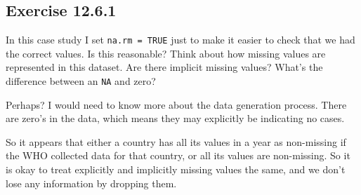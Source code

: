 \documentclass[]{book}
\newenvironment{Shaded}{\begin{snugshade}}{\end{snugshade}}
\newcommand{\CommentTok}[1]{\textcolor[rgb]{0.56,0.35,0.01}{\textit{#1}}}
\newcommand{\DataTypeTok}[1]{\textcolor[rgb]{0.13,0.29,0.53}{#1}}
\newcommand{\DecValTok}[1]{\textcolor[rgb]{0.00,0.00,0.81}{#1}}
\newcommand{\KeywordTok}[1]{\textcolor[rgb]{0.13,0.29,0.53}{\textbf{#1}}}
\newcommand{\NormalTok}[1]{#1}
\newcommand{\OperatorTok}[1]{\textcolor[rgb]{0.81,0.36,0.00}{\textbf{#1}}}
\newcommand{\StringTok}[1]{\textcolor[rgb]{0.31,0.60,0.02}{#1}}
\theoremstyle{plain}
\theoremstyle{remark}
\theoremstyle{definition}
\theoremstyle{definition}
\theoremstyle{definition}
\theoremstyle{remark}
\begin{document}
\hypertarget{exercise-12.6.1}{%
\subsection*{\texorpdfstring{Exercise
{12.6.1}}{Exercise 12.6.1}}\label{exercise-12.6.1}}

In this case study I set \texttt{na.rm\ =\ TRUE} just to make it easier
to check that we had the correct values. Is this reasonable? Think about
how missing values are represented in this dataset. Are there implicit
missing values? What's the difference between an \texttt{NA} and zero?

Perhaps? I would need to know more about the data generation process.
There are zero's in the data, which means they may explicitly be
indicating no cases.

\begin{Shaded}
\end{Shaded}

So it appears that either a country has all its values in a year as
non-missing if the WHO collected data for that country, or all its
values are non-missing. So it is okay to treat explicitly and implicitly
missing values the same, and we don't lose any information by dropping
them.

\begin{Shaded}
\end{Shaded}
\end{document}
